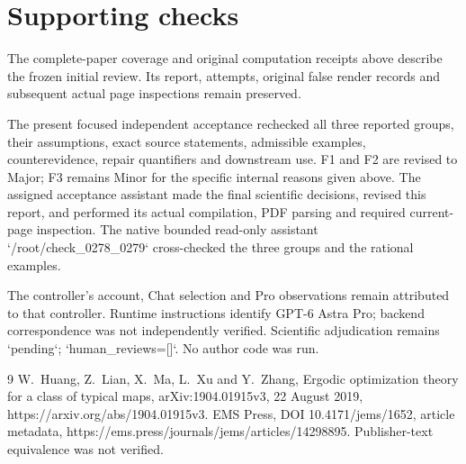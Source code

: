 \documentclass[10pt]{article}
\begin{document}
\section*{Supporting checks}
The complete-paper coverage and original computation receipts above describe the frozen initial review. Its report, attempts, original false render records and subsequent actual page inspections remain preserved.\par
The present focused independent acceptance rechecked all three reported groups, their assumptions, exact source statements, admissible examples, counterevidence, repair quantifiers and downstream use. F1 and F2 are revised to Major; F3 remains Minor for the specific internal reasons given above. The assigned acceptance assistant made the final scientific decisions, revised this report, and performed its actual compilation, PDF parsing and required current-page inspection. The native bounded read-only assistant `/root/check\_0278\_0279` cross-checked the three groups and the rational examples.\par
The controller’s account, Chat selection and Pro observations remain attributed to that controller. Runtime instructions identify GPT-6 Astra Pro; backend correspondence was not independently verified. Scientific adjudication remains `pending`; `human\_reviews=[]`. No author code was run.\par
9 W. Huang, Z. Lian, X. Ma, L. Xu and Y. Zhang, Ergodic optimization theory for a class of typical maps, arXiv:1904.01915v3, 22 August 2019, https://arxiv.org/abs/1904.01915v3. EMS Press, DOI 10.4171/jems/1652, article metadata, https://ems.press/journals/jems/articles/14298895. Publisher-text equivalence was not verified.\par
\end{document}
